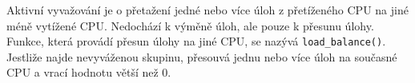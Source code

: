 \documentclass[a4paper,12pt]{article}
\begin{document}
Aktivní vyvažování je o přetažení jedné nebo více úloh z přetíženého CPU na jiné méně vytížené CPU. Nedochází k výměně úloh, ale pouze k přesunu úlohy. Funkce, která provádí přesun úlohy na jiné CPU, se nazývá \verb#load_balance()#. Jestliže najde nevyváženou skupinu, přesouvá jednu nebo více úloh na současné CPU a vrací hodnotu větší než 0.

%
%
%
%
%
%
%
%
%
%
%
%
%
%
%
%
%
\end{document}
